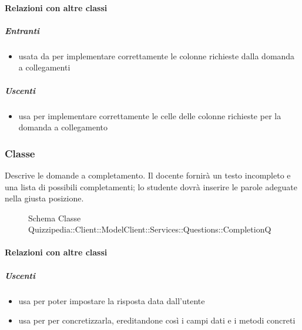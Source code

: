 \paragraph{Relazioni con altre classi}
\subparagraph{Entranti}
\begin{itemize}
\item usata da  per implementare correttamente le colonne richieste dalla domanda a collegamenti
\end{itemize}
\subparagraph{Uscenti}
\begin{itemize}
\item usa  per implementare correttamente le celle delle colonne richieste per la domanda a collegamento
\end{itemize}
\subsubsection{Classe }
Descrive le domande a completamento. Il docente fornirà un testo incompleto e una lista di possibili completamenti; lo studente dovrà inserire le parole adeguate nella giusta posizione.
\begin{figure}[H]
\centering
\noindent{}
\caption[Schema Classe CompletionQ]{Schema Classe Quizzipedia::Client::ModelClient::Services::Questions::CompletionQ}
\end{figure}
\paragraph{Relazioni con altre classi}
\subparagraph{Uscenti}
\begin{itemize}
\item usa  per poter impostare la risposta data dall'utente
\item usa  per per concretizzarla, ereditandone così i campi dati e i metodi concreti
\end{itemize}
